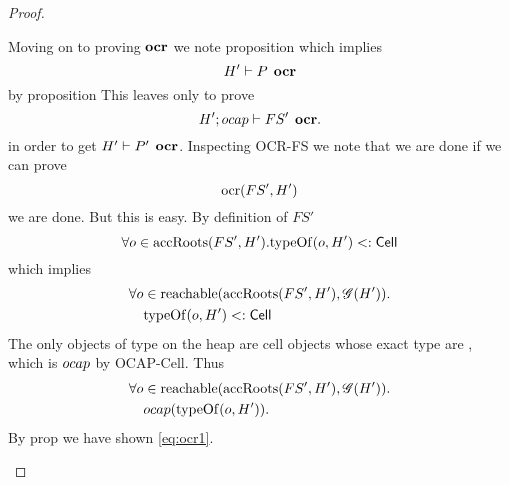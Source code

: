 \begin{proof}
\begin{description}
      Moving on to proving $\mbox{\bf ocr}$ we note proposition %
      which implies
      \begin{equation}
        H' \vdash P \:\: \mbox{\bf ocr}
      \end{equation}
      by proposition %
      This leaves only to prove
      \begin{equation}
        H'; \mbox{$ocap$} \vdash FS' \:\: \mbox{\bf ocr}.
      \end{equation}
      in order to get $H' \vdash P' \:\: \mbox{\bf ocr}$.
      Inspecting {\sc OCR-FS} we note that we are done if we can prove
      \begin{equation} \label{eq:ocr1}
        \mbox{$\mathrm{ocr}$}(FS', H')
      \end{equation}
      we are done. But this is easy. By definition of $FS'$
      \begin{equation}
        \forall o \in \mbox{$\mathrm{accRoots}$}(FS', H'). \mbox{$\mathrm{typeOf}$}(o, H') <: \mbox{$\mathsf{Cell}$}
      \end{equation}
      which implies
      \begin{equation} \label{eq:espawn-ocr2}
        \begin{aligned}
          \forall o &\in \mbox{$\mathrm{reachable}$}(\mbox{$\mathrm{accRoots}$}(FS', H'), \mathscr{G}(H')). \\
            &\mbox{$\mathrm{typeOf}$}(o, H') <: \mbox{$\mathsf{Cell}$}
        \end{aligned}
      \end{equation}
      The only objects of type \CellType{} on the heap are cell objects 
      whose exact type are \CellType{}, which is $\mbox{$ocap$}$ by {\sc OCAP-Cell}.
      Thus
      \begin{equation}
        \begin{aligned}
          \forall o &\in \mbox{$\mathrm{reachable}$}(\mbox{$\mathrm{accRoots}$}(FS', H'), \mathscr{G}(H')). \\
            &\mbox{$ocap$}(\mbox{$\mathrm{typeOf}$}(o, H')).
        \end{aligned}
      \end{equation}
      By prop %
      we have shown \eqref{eq:ocr1}.


\end{description}
\end{proof}
